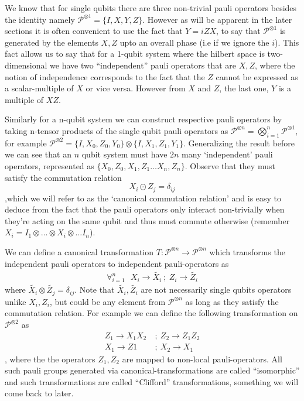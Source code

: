 \documentclass[
]{article}
\begin{document}
We know that for single qubits there are three non-trivial pauli
operators besides the identity namely
\(\mathcal{P}^{\otimes 1} = \{I, X, Y ,Z\}\). However as will be
apparent in the later sections it is often convenient to use the fact
that \(Y = i ZX\), to say that \(\mathcal{P}^{\otimes1}\) is generated
by the elements \(X,Z\) upto an overall phase (i.e if we ignore the
\(i\)). This fact allows us to say that for a 1-qubit system where the
hilbert space is two-dimensional we have two ``independent'' pauli
operators that are \(X,Z\), where the notion of independence corresponds
to the fact that the \(Z\) cannot be expressed as a scalar-multiple of
\(X\) or vice versa. However from \(X\) and \(Z\), the last one, \(Y\)
is a multiple of \(XZ\).

Similarly for a n-qubit system we can construct respective pauli
operators by taking n-tensor products of the single qubit pauli
operators as
\(\mathcal{P}^{\otimes n} = \bigotimes_{i=1}^{n}\mathcal{P}^{\otimes 1}\),
for example
\(\mathcal{P}^{\otimes2}=\{I, X_{0}, Z_{0},Y_{0}\}\otimes \{I, X_{1}, Z_{1}, Y_{1}\}\).
Generalizing the result before we can see that an \(n\) qubit system
must have \(2n\) many `independent' pauli operators, represented as
\(\{X_{0}, Z_{0}, X_{1}, Z_{1} \dots X_{n}, Z_{n}\}\). Observe that they
must satisfy the commutation relation
\[X_{i} \odot Z_{j}= \delta_{ij}\],which we will refer to as the
`canonical commutation relation' and is easy to deduce from the fact
that the pauli operators only interact non-trivially when they're acting
on the same qubit and thus must commute otherwise (remember
\(X_{i}= I_1 \otimes \dots \otimes X_{i} \otimes \dots I_n\)).

We can define a canonical transformation
\(T: \mathcal{P}^{\otimes n} \to \mathcal{P}^{\otimes n}\) which
transforms the independent pauli operators to independent
pauli-operators as
\[\begin{align} \forall_{i=1}^{n} \:\:\: X_{i} \to \tilde{X_{i}}\:; \: Z_{i}\to \tilde{Z_i}\end{align}\]
where \(\tilde{X_{i}} \otimes \tilde{Z_{j}} = \delta_{ij}\). Note that
\(\tilde{X_{i}}, \tilde{Z_{i}}\) are not necessarily single qubits
operators unlike \(X_{i}, Z_{i}\), but could be any element from
\(\mathcal{P}^{\otimes n}\) as long as they satisfy the commutation
relation. For example we can define the following transformation on
\(\mathcal{P}^{\otimes 2}\) as
\[\begin{align} Z_{1} \to X_{1}X_{2} \:&;\: Z_{2}\to Z_{1}Z_{2} \\ X_{1} \to Z1 \:&; \: X_{2} \to X_1 \end{align}\],
where the the operators \(Z_{1}, Z_{2}\) are mapped to non-local
pauli-operators. All such pauli groups generated via
canonical-transformations are called ``isomorphic'' and such
transformations are called ``Clifford'' transformations, something we
will come back to later.
\end{document}
